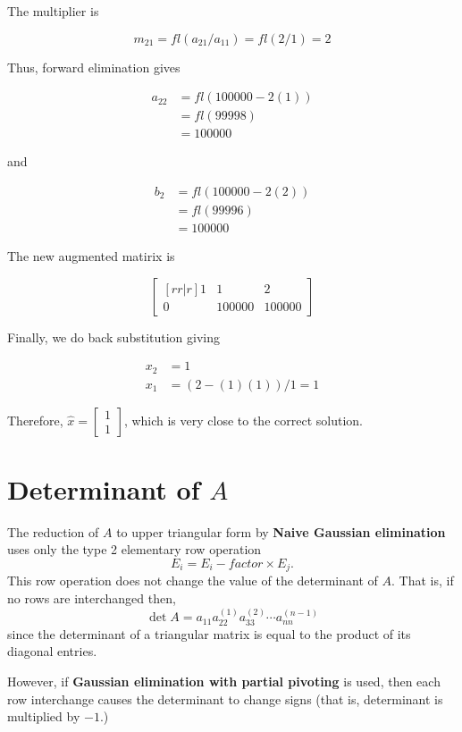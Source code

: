 \documentclass [titlepage,12pt,letter] {article}
\begin{document}
The multiplier is

\[
m_{21}=fl(a_{21}/a_{11})=fl(2/1)=2
\]

Thus, forward elimination gives

\begin{align*}
a_{22}&=fl(100000-2(1)) \\
&=fl(99998) \\
&=100000
\end{align*}

and

\begin{align*}
b_2&=fl(100000-2(2)) \\
&=fl(99996) \\
&=100000
\end{align*}

The new augmented matirix is

\[
\begin{bmatrix}[rr|r]
 1  &  1 & 2 \\
  0  &  100000  &  100000
\end{bmatrix}
\]

Finally, we do back substitution giving

\begin{align*}
x_2&=1 \\
x_1&=(2-(1)(1))/1 = 1
\end{align*}

Therefore, $\hat{x}=\begin{bmatrix} 1 \\ 1 \end{bmatrix}$, which is very close to the correct solution.

\section{Determinant of $A$}

The reduction of $A$ to upper triangular form by {\bf Naive Gaussian elimination} uses only the type 2 elementary row operation
\[ E_i = E_i - factor \times E_j. \]
This row operation does not change the value of the determinant of $A$.
That is, if no rows are interchanged then,
\[ \det A = a_{11}a_{22}^{(1)}a_{33}^{(2)} \dotsm a_{nn}^{(n-1)} \]
since the determinant of a triangular matrix is equal to the product of its diagonal entries.

However, if {\bf Gaussian elimination with partial pivoting} is used, then each row interchange causes the determinant to change signs 
(that is, determinant is multiplied by $-1$.)
\end{document}
